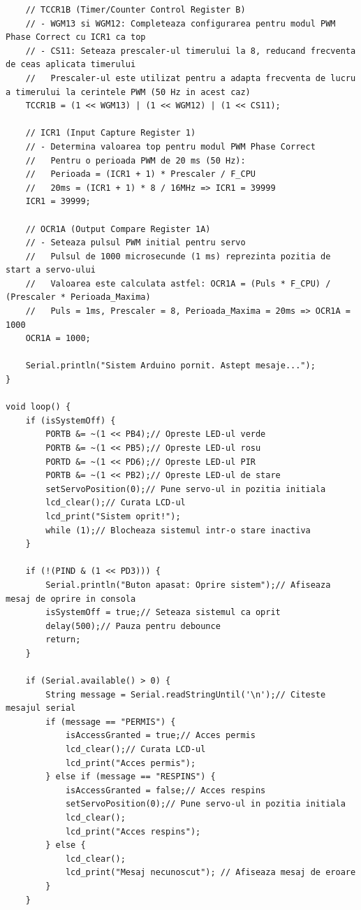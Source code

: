 \documentclass[a4paper,12pt]{report}
\begin{document}
\begin{lstlisting}
    // TCCR1B (Timer/Counter Control Register B)
    // - WGM13 si WGM12: Completeaza configurarea pentru modul PWM Phase Correct cu ICR1 ca top
    // - CS11: Seteaza prescaler-ul timerului la 8, reducand frecventa de ceas aplicata timerului
    //   Prescaler-ul este utilizat pentru a adapta frecventa de lucru a timerului la cerintele PWM (50 Hz in acest caz)
    TCCR1B = (1 << WGM13) | (1 << WGM12) | (1 << CS11);

    // ICR1 (Input Capture Register 1)
    // - Determina valoarea top pentru modul PWM Phase Correct
    //   Pentru o perioada PWM de 20 ms (50 Hz):
    //   Perioada = (ICR1 + 1) * Prescaler / F_CPU
    //   20ms = (ICR1 + 1) * 8 / 16MHz => ICR1 = 39999
    ICR1 = 39999;

    // OCR1A (Output Compare Register 1A)
    // - Seteaza pulsul PWM initial pentru servo
    //   Pulsul de 1000 microsecunde (1 ms) reprezinta pozitia de start a servo-ului
    //   Valoarea este calculata astfel: OCR1A = (Puls * F_CPU) / (Prescaler * Perioada_Maxima)
    //   Puls = 1ms, Prescaler = 8, Perioada_Maxima = 20ms => OCR1A = 1000
    OCR1A = 1000;
    
    Serial.println("Sistem Arduino pornit. Astept mesaje...");
}

void loop() {
    if (isSystemOff) {
        PORTB &= ~(1 << PB4);// Opreste LED-ul verde
        PORTB &= ~(1 << PB5);// Opreste LED-ul rosu
        PORTD &= ~(1 << PD6);// Opreste LED-ul PIR
        PORTB &= ~(1 << PB2);// Opreste LED-ul de stare
        setServoPosition(0);// Pune servo-ul in pozitia initiala
        lcd_clear();// Curata LCD-ul
        lcd_print("Sistem oprit!");
        while (1);// Blocheaza sistemul intr-o stare inactiva
    }

    if (!(PIND & (1 << PD3))) {
        Serial.println("Buton apasat: Oprire sistem");// Afiseaza mesaj de oprire in consola
        isSystemOff = true;// Seteaza sistemul ca oprit
        delay(500);// Pauza pentru debounce
        return;
    }

    if (Serial.available() > 0) {
        String message = Serial.readStringUntil('\n');// Citeste mesajul serial
        if (message == "PERMIS") {
            isAccessGranted = true;// Acces permis
            lcd_clear();// Curata LCD-ul
            lcd_print("Acces permis");
        } else if (message == "RESPINS") {
            isAccessGranted = false;// Acces respins
            setServoPosition(0);// Pune servo-ul in pozitia initiala
            lcd_clear();
            lcd_print("Acces respins");
        } else {
            lcd_clear();
            lcd_print("Mesaj necunoscut"); // Afiseaza mesaj de eroare
        }
    }


\end{lstlisting}
\end{document}
